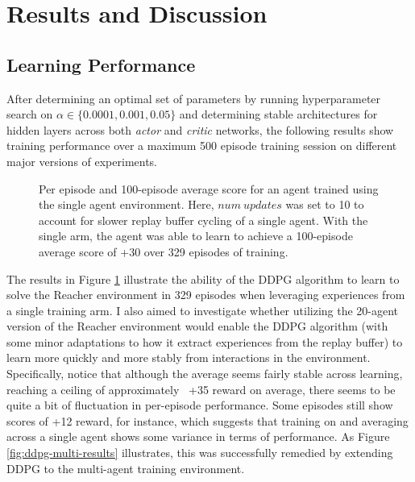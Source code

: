\documentclass[11pt]{article}
\begin{document}
	\FloatBarrier
	
	
	\section{Results and Discussion}
	
	\subsection{Learning Performance}
	
	After determining an optimal set of parameters by running hyperparameter search on $\alpha \in \{0.0001, 0.001, 0.05\}$ and determining stable architectures for hidden layers across both \textit{actor} and \textit{critic} networks, the following results show training performance over a maximum 500 episode training session on different major versions of experiments.
	
	\FloatBarrier
	
	\begin{figure}[!ht]
		\centering
		\caption{Per episode and 100-episode average score for an agent trained using the single agent environment. Here, $num\ updates$ was set to 10 to account for slower replay buffer cycling of a single agent. With the single arm, the agent was able to learn to achieve a 100-episode average score of +30 over 329 episodes of training.}
		\label{fig:ddpg-single-results}
	\end{figure}
	
	\FloatBarrier
	
	The results in Figure \ref{fig:ddpg-single-results} illustrate the ability of the DDPG algorithm to learn to solve the Reacher environment in 329 episodes when leveraging experiences from a single training arm. I also aimed to investigate whether utilizing the 20-agent version of the Reacher environment would enable the DDPG algorithm (with some minor adaptations to how it extract experiences from the replay buffer) to learn more quickly and more stably from interactions in the environment. Specifically, notice that although the average seems fairly stable across learning, reaching a ceiling of approximately ~+35 reward on average, there seems to be quite a bit of fluctuation in per-episode performance. Some episodes still show scores of +12 reward, for instance, which suggests that training on and averaging across a single agent shows some variance in terms of performance. As Figure \ref{fig:ddpg-multi-results} illustrates, this was successfully remedied by extending DDPG to the multi-agent training environment.
	
\end{document}

